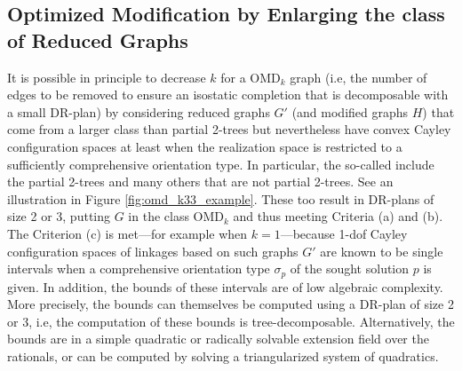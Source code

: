 \subsection{Optimized Modification by Enlarging the class of Reduced
Graphs}
\label{sec:tdecomp}
%
It is possible in principle to decrease $k$ for a OMD$_k$ graph (i.e, the number of edges to be removed to ensure an isostatic completion that is decomposable with a small DR-plan) by considering reduced graphs $G'$ (and modified graphs $H$) that come from a larger class than partial 2-trees but nevertheless have convex Cayley configuration spaces at least when the realization space is restricted to a sufficiently comprehensive orientation type. In particular, the so-called  \cite{sitharam2011cayleyI,sitharam2011cayleyII} include the partial 2-trees and many others that are not partial 2-trees. See an illustration in Figure \ref{fig:omd_k33_example}. These too result in DR-plans of size 2 or 3, putting $G$ in the class OMD$_k$ and thus meeting Criteria (a) and (b). The Criterion (c) is met---for example when $k=1$---because 1-dof Cayley configuration spaces of linkages based on such graphs $G'$ are known to be single intervals when a comprehensive orientation type $\sigma_p$ of the sought solution $p$ is given. In addition, the bounds of these intervals are of low algebraic complexity. More precisely, the bounds  can themselves be computed using a DR-plan of size 2 or 3, i.e, the computation of these bounds is tree-decomposable. Alternatively, the bounds are in a simple quadratic or radically solvable extension field over the rationals, or can be computed by solving a triangularized system of quadratics.
